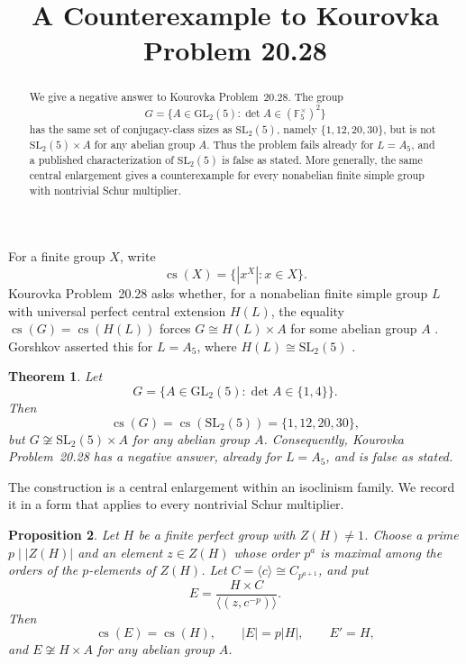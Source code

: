 \documentclass[11pt]{amsart}
\title{A Counterexample to Kourovka Problem 20.28}
\date{}
\newtheorem{theorem}{Theorem}
\newtheorem{proposition}[theorem]{Proposition}
\theoremstyle{remark}
\newcommand{\cs}{\operatorname{cs}}
\newcommand{\F}{\mathbb F}
\begin{document}
\begin{abstract}
We give a negative answer to Kourovka Problem~20.28.  The group
\[
G=\{A\in \mathrm{GL}_2(5):\det A\in(\F_5^\times)^2\}
\]
has the same set of conjugacy-class sizes as \(\mathrm{SL}_2(5)\), namely
\(\{1,12,20,30\}\), but is not \(\mathrm{SL}_2(5)\times A\) for any
abelian group \(A\).  Thus the problem fails already for \(L=A_5\), and a
published characterization of \(\mathrm{SL}_2(5)\) is false as stated.
More generally, the same central enlargement gives a counterexample for every
nonabelian finite simple group with nontrivial Schur multiplier.
\end{abstract}

\maketitle

For a finite group \(X\), write
\[
\cs(X)=\{|x^X|:x\in X\}.
\]
Kourovka Problem~20.28 asks whether, for a nonabelian finite simple group
\(L\) with universal perfect central extension \(H(L)\), the equality
\(\cs(G)=\cs(H(L))\) forces \(G\cong H(L)\times A\) for some abelian group
\(A\) \cite[Problem~20.28]{Kourovka}.  Gorshkov asserted this for
\(L=A_5\), where \(H(L)\cong \mathrm{SL}_2(5)\)
\cite[Theorem~1]{Gorshkov}.

\begin{theorem}\label{thm:main}
Let
\[
G=\{A\in \mathrm{GL}_2(5):\det A\in\{1,4\}\}.
\]
Then
\[
\cs(G)=\cs(\mathrm{SL}_2(5))=\{1,12,20,30\},
\]
but \(G\not\cong \mathrm{SL}_2(5)\times A\) for any abelian group
\(A\).  Consequently, Kourovka Problem~20.28 has a negative answer, already
for \(L=A_5\), and \cite[Theorem~1]{Gorshkov} is false as stated.
\end{theorem}

The construction is a central enlargement within an isoclinism family.
We record it in a form that applies to every nontrivial Schur multiplier.

\begin{proposition}\label{prop:central}
Let \(H\) be a finite perfect group with \(Z(H)\ne 1\).  Choose a prime
\(p\mid |Z(H)|\) and an element \(z\in Z(H)\) whose order \(p^a\) is
maximal among the orders of the \(p\)-elements of \(Z(H)\).  Let
\(C=\langle c\rangle\cong C_{p^{a+1}}\), and put
\[
E=\frac{H\times C}{\langle(z,c^{-p})\rangle}.
\]
Then
\[
\cs(E)=\cs(H),\qquad |E|=p|H|,\qquad E'=H,
\]
and \(E\not\cong H\times A\) for any abelian group \(A\).
\end{proposition}
\end{document}
